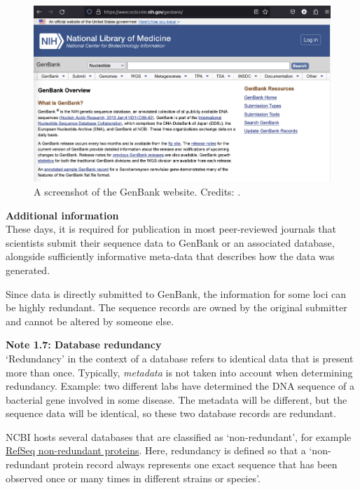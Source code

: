 \begin{figure}[!htbp]
\centering
\includegraphics[width=1\linewidth]{files/genbank-f7d7daa5982bc401e1c7f56159ba59fb.png}
\caption[]{A screenshot of the GenBank website. Credits: \cite{genbank_2012}.}
\label{genbank_figure}
\end{figure}

\begin{framed}
\textbf{Additional information}\\
These days, it is required for publication in most peer-reviewed journals that scientists submit their sequence data to GenBank or an associated database, alongside sufficiently informative meta-data that describes how the data was generated.
\end{framed}

Since data is directly submitted to GenBank, the information for some loci can be highly redundant.
The sequence records are owned by the original submitter and cannot be altered by someone else.

\begin{framed}
\textbf{Note 1.7: Database redundancy}\\
`Redundancy' in the context of a database refers to identical data that is present more than once.
Typically, \textit{metadata} is not taken into account when determining redundancy.
Example: two different labs have determined the DNA sequence of a bacterial gene involved in some disease.
The metadata will be different, but the sequence data will be identical, so these two database records are redundant.

NCBI hosts several databases that are classified as `non-redundant', for example \href{https://www.ncbi.nlm.nih.gov/refseq/about/nonredundantproteins/}{RefSeq non-redundant proteins}.
Here, redundancy is defined so that a `non-redundant protein record always represents one exact sequence that has been observed once or many times in different strains or species'.
\end{framed}

